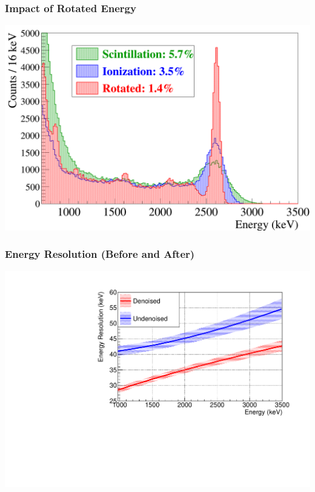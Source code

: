\documentclass{beamer}
\begin{document}
\begin{frame}
\begin{center}
\frametitle{Impact of Rotated Energy}
\end{center}
\begin{center}
\includegraphics[keepaspectratio=true,width=\textwidth]{RotationTh2D_ImprovementInResolution.png}
\end{center}
\end{frame}

\begin{frame}
\begin{center}
\frametitle{Energy Resolution (Before and After)}
\end{center}
\vspace{0.5cm}
\begin{center}
\includegraphics[keepaspectratio=true,width=\textwidth,clip=true,trim=0mm 0mm 10mm 10mm]{ResolutionFunctionComparison_absolute.pdf}
\end{center}
\end{frame}

\end{document}
